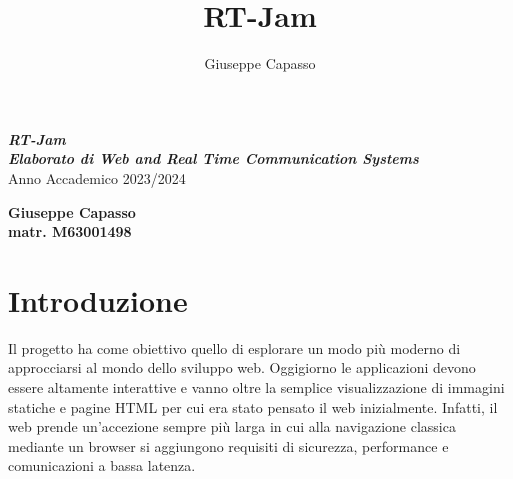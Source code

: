 \documentclass{article}
\title{RT-Jam}
\author{Giuseppe Capasso}
\begin{document}
\begin{titlepage}
  \thispagestyle{empty}
  \raggedright %


  \vfill

  {\textbf{\textit{\LARGE RT-Jam}}}
  \\[2cm]

  {\textbf{\textit{\Large Elaborato di Web and Real Time Communication Systems}}}
  \\[1cm]
  {\large Anno Accademico 2023/2024}

  \vfill

  \begin{table}[h]
    \textbf{Giuseppe Capasso}
    \\
    \textbf{matr. M63001498}
  \end{table}

\end{titlepage}

\tableofcontents
\newpage

\section*{Introduzione}
Il progetto ha come obiettivo quello di esplorare un modo più moderno di approcciarsi al 
mondo dello sviluppo web. Oggigiorno le applicazioni devono essere altamente interattive e
vanno oltre la semplice visualizzazione di immagini statiche e pagine HTML per cui era stato
pensato il web inizialmente. Infatti, il web prende un'accezione sempre più larga
in cui alla navigazione classica mediante un browser si aggiungono requisiti di sicurezza,
performance e comunicazioni a bassa latenza. 
\end{document}
